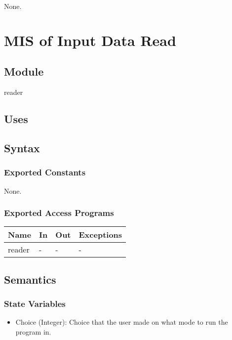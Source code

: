 \documentclass[12pt, titlepage]{article}
\begin{document}
None.

\newpage

\section{MIS of Input Data Read} \label{ModuleIDR} 

\subsection{Module}
reader
\subsection{Uses}

\subsection{Syntax}

\subsubsection{Exported Constants}

None.

\subsubsection{Exported Access Programs}

\begin{center}
\begin{tabular}{p{2cm} p{4cm} p{4cm} p{2cm}}
\hline
\textbf{Name} & \textbf{In} & \textbf{Out} & \textbf{Exceptions} \\
\hline
reader & - & - & - \\
\hline
\end{tabular}
\end{center}

\subsection{Semantics}

\subsubsection{State Variables}

\begin{itemize}
  \item Choice (Integer): Choice that the user made on what mode to run the program in.
\end{itemize}
\end{document}
